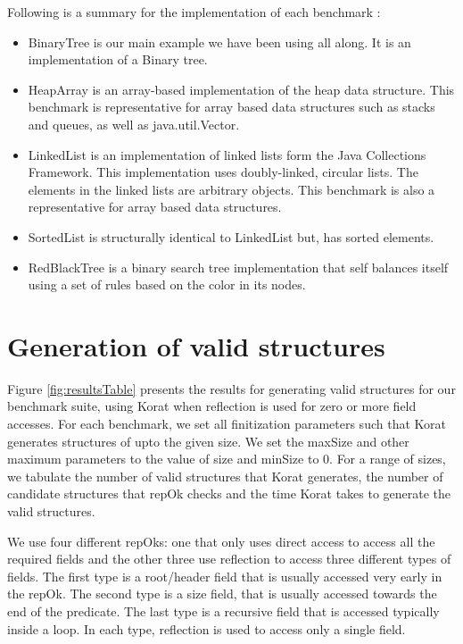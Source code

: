 \para
Following is a summary for the implementation of each benchmark : 
\begin{itemize}
\item BinaryTree is our main example we have been using all along. It is an implementation of a Binary tree.
\item HeapArray is an array-based implementation of the heap data structure. This benchmark is representative for array based data structures such as stacks and queues, as well as java.util.Vector.
\item LinkedList is an implementation of linked lists form the Java Collections Framework. This implementation uses doubly-linked, circular lists. The elements in the linked lists are arbitrary objects. This benchmark is also a representative for array based data structures.
\item SortedList is structurally identical to LinkedList but, has sorted elements.
\item RedBlackTree is a binary search tree implementation that self balances itself using a set of rules based on the color in its nodes.
\end{itemize}

\section{Generation of valid structures}
\label{sec:generation-of-valid-structures}
Figure \ref{fig:resultsTable} presents the results for generating valid structures for our benchmark suite, using Korat when reflection is used for zero or more field accesses. For each benchmark, we set all finitization parameters such that Korat generates structures of upto the given size. We set the maxSize and other maximum parameters to the value of size and minSize to 0. For a range of sizes, we tabulate the number of valid structures that Korat generates, the number of candidate structures that repOk checks and the time Korat takes to generate the valid structures. 

\para
We use four different repOks: one that only uses direct access to access all the required fields and the other three use reflection to access three different types of fields. The first type is a root/header field that is usually accessed very early in the repOk. The second type is a size field, that is usually accessed towards the end of the predicate. The last type is a recursive field that is accessed typically inside a loop. In each type, reflection is used to access only a single field. 


